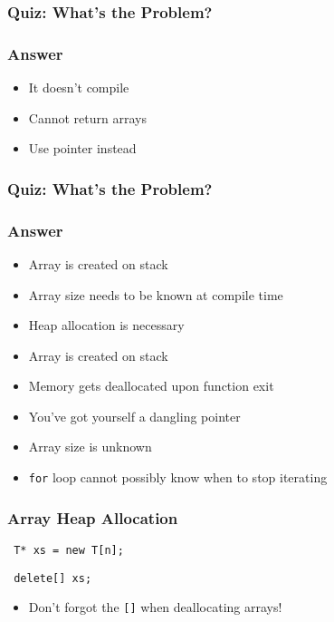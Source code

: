 \documentclass[handout]{ucll-slides}
\begin{document}
\begin{frame}
  \frametitle{Quiz: What's the Problem?}
\end{frame}

\begin{frame}
  \frametitle{Answer}
  \Large
  \begin{itemize}
    \item It doesn't compile
    \item Cannot return arrays
    \item Use pointer instead
   \end{itemize}
\end{frame}

\begin{frame}
  \frametitle{Quiz: What's the Problem?}
\end{frame}

\begin{frame}
  \frametitle{Answer}
  \begin{itemize}
    \item Array is created on stack
    \item Array size needs to be known at compile time
    \item Heap allocation is necessary
  \end{itemize}
  \vskip5mm
  \begin{itemize}
    \item Array is created on stack
    \item Memory gets deallocated upon function exit
    \item You've got yourself a dangling pointer
  \end{itemize}
  \vskip5mm
  \begin{itemize}
    \item Array size is unknown
    \item {\tt for} loop cannot possibly know when to stop iterating
  \end{itemize}
\end{frame}

\begin{frame}
  \frametitle{Array Heap Allocation}
  \begin{center} \tt
    T* xs = new T[n];
  \end{center}
  \vskip5mm
  \begin{center} \tt
    delete[] xs;
  \end{center}
  \begin{itemize}
    \item Don't forgot the {\tt []} when deallocating arrays!
  \end{itemize}
\end{frame}
\end{document}
